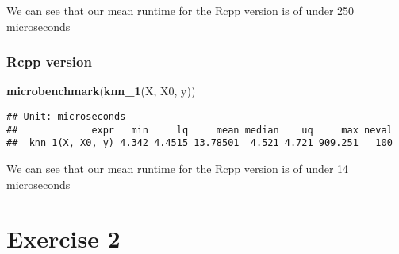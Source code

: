\documentclass[]{article}
\newenvironment{Shaded}{\begin{snugshade}}{\end{snugshade}}
\newcommand{\KeywordTok}[1]{\textcolor[rgb]{0.13,0.29,0.53}{\textbf{#1}}}
\newcommand{\NormalTok}[1]{#1}
\begin{document}
We can see that our mean runtime for the Rcpp version is of under 250
microseconds

\hypertarget{rcpp-version}{%
\subsubsection{Rcpp version}\label{rcpp-version}}

\begin{Shaded}
\begin{Highlighting}[]
\KeywordTok{microbenchmark}\NormalTok{(}\KeywordTok{knn_1}\NormalTok{(X, X0, y))}
\end{Highlighting}
\end{Shaded}

\begin{verbatim}
## Unit: microseconds
##             expr   min     lq     mean median    uq     max neval
##  knn_1(X, X0, y) 4.342 4.4515 13.78501  4.521 4.721 909.251   100
\end{verbatim}

We can see that our mean runtime for the Rcpp version is of under 14
microseconds

\hypertarget{exercise-2}{%
\section{Exercise 2}\label{exercise-2}}
\end{document}
